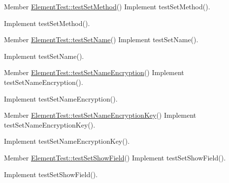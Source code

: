\label{todo__todo000114}
\hypertarget{todo__todo000114}{}
 
\begin{DoxyDescription}
\item[Member \hyperlink{class_element_test_a555789228c0bf03172e990bcc78d07b5}{ElementTest::testSetMethod}() ]Implement testSetMethod().

Implement testSetMethod().
\end{DoxyDescription}

\label{todo__todo000108}
\hypertarget{todo__todo000108}{}
 
\begin{DoxyDescription}
\item[Member \hyperlink{class_element_test_a4cd685f2226d97a555ffda557a9d1f0d}{ElementTest::testSetName}() ]Implement testSetName().

Implement testSetName().
\end{DoxyDescription}

\label{todo__todo000128}
\hypertarget{todo__todo000128}{}
 
\begin{DoxyDescription}
\item[Member \hyperlink{class_element_test_aab0c54c37022421730b2d3c0f2b65c72}{ElementTest::testSetNameEncryption}() ]Implement testSetNameEncryption().

Implement testSetNameEncryption().
\end{DoxyDescription}

\label{todo__todo000129}
\hypertarget{todo__todo000129}{}
 
\begin{DoxyDescription}
\item[Member \hyperlink{class_element_test_ae591f8ca3247335c6028b01c883592c3}{ElementTest::testSetNameEncryptionKey}() ]Implement testSetNameEncryptionKey().

Implement testSetNameEncryptionKey().
\end{DoxyDescription}

\label{todo__todo000126}
\hypertarget{todo__todo000126}{}
 
\begin{DoxyDescription}
\item[Member \hyperlink{class_element_test_ac411fc625bf192b6fd8e850115eb8f25}{ElementTest::testSetShowField}() ]Implement testSetShowField().

Implement testSetShowField().
\end{DoxyDescription}


